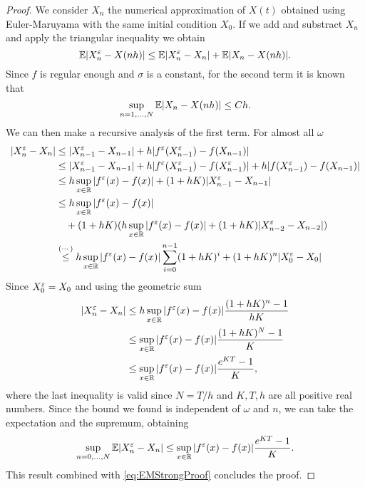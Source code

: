 \begin{proof} We consider $X_n$ the numerical approximation of $X(t)$ obtained using Euler-Maruyama with the same initial condition $X_0$. If we add and substract $X_n$ and apply the triangular inequality we obtain
\begin{equation*}
	\mathbb{E} |X_n^\varepsilon - X(nh)| \leq \mathbb{E} |X_n^\varepsilon - X_n| + \mathbb{E} |X_n - X(nh)|. \\
\end{equation*}
Since $f$ is regular enough and $\sigma$ is a constant, for the second term it is known that
\begin{equation}\label{eq:EMStrongProof}
	\sup_{n = 1, \dots, N} \mathbb{E} |X_n - X(nh)| \leq C h.
\end{equation}
We can then make a recursive analysis of the first term. For almost all $\omega$
\begin{equation*}
\begin{aligned}
	|X^\varepsilon_n - X_n| &\leq |X_{n-1}^\varepsilon - X_{n-1}| + h|f^\varepsilon(X^\varepsilon_{n-1}) - f(X_{n-1})|  \\
	&\leq |X_{n-1}^\varepsilon - X_{n-1}| + h|f^\varepsilon(X^\varepsilon_{n-1}) - f(X^\varepsilon_{n-1})| + h|f(X^\varepsilon_{n-1}) - f(X_{n-1})| \\
	&\leq h \sup_{x \in \mathbb{R}} |f^\varepsilon(x) - f(x)| + (1 + hK) |X_{n-1}^\varepsilon - X_{n-1}| \\
	&\leq h \sup_{x \in \mathbb{R}} |f^\varepsilon(x) - f(x)| \\
	&\quad + (1 + hK) (h \sup_{x \in \mathbb{R}} |f^\varepsilon(x) - f(x)| + (1 + hK)|X_{n-2}^\varepsilon - X_{n-2}|) \\
	&\stackrel{(\cdots)}{\leq} h \sup_{x \in \mathbb{R}} |f^\varepsilon(x) - f(x)| \sum_{i = 0}^{n-1} (1 + hK)^i + (1 + hK)^n |X_0^\varepsilon - X_0|
\end{aligned}
\end{equation*}
Since $X_0^\varepsilon = X_0$ and using the geometric sum
\begin{equation*}
\begin{aligned}
	|X^\varepsilon_n - X_n| &\leq h \sup_{x \in \mathbb{R}} |f^\varepsilon(x) - f(x)| \frac{(1 + hK)^n - 1}{hK} \\
	&\leq \sup_{x \in \mathbb{R}} |f^\varepsilon(x) - f(x)| \frac{(1 + hK)^N - 1}{K} \\
	&\leq \sup_{x \in \mathbb{R}} |f^\varepsilon(x) - f(x)| \frac{e^{KT} - 1}{K},
\end{aligned}
\end{equation*}
where the last inequality is valid since $N = T/h$ and $K, T, h$ are all positive real numbers. Since the bound we found is independent of $\omega$ and $n$, we can take the expectation and the supremum, obtaining
\begin{equation}\label{eq:DiffXeplnXn}
	\sup_{n = 0, \dots, N} \mathbb{E} |X^\varepsilon_n - X_n| \leq \sup_{x \in \mathbb{R}} |f^\varepsilon(x) - f(x)| \frac{e^{KT} - 1}{K}.
\end{equation}
This result combined with \eqref{eq:EMStrongProof} concludes the proof.
\end{proof}
